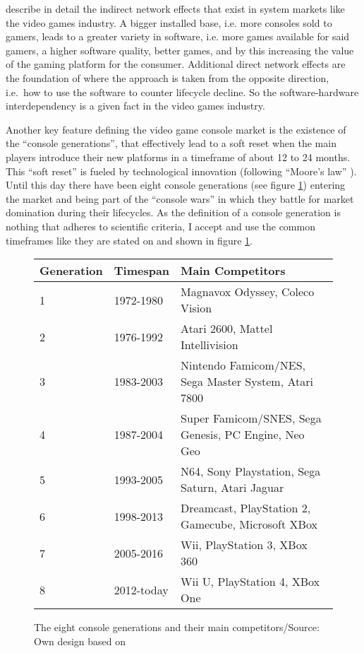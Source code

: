 \documentclass
[
    a4paper,
    11pt
]
{article}
\begin{document}
\cite{KatzMichaelL.1994} describe in detail the indirect network effects
that exist in system markets like the video games industry. A bigger
installed base, i.e. more consoles sold to gamers, leads to a greater
variety in software, i.e. more games available for said gamers, a higher
software quality, better games, and by this increasing the value of the
gaming platform for the consumer. Additional direct network effects are
the foundation of \cite{Marchand2016} where the approach is taken from
the opposite direction, i.e.~how to use the software to counter
lifecycle decline. So the software-hardware interdependency is a given fact
in the video games industry.\cite{Clements2005}

Another key feature defining the video game console market is the
existence of the ``console generations'', that effectively lead to a
soft reset when the main players introduce their new platforms in a
timeframe of about 12 to 24 months. This ``soft reset'' is fueled by
technological innovation \cite{Orland2013}(following ``Moore's law''
\cite{Moore1965}). Until this day there have been eight console
generations (see figure \ref{tab:generations}) entering the market and
being part of the ``console wars'' in which they battle for market
domination during their lifecycles. \cite{EncyclopediaGamia2016} As the
definition of a console generation is nothing that adheres to scientific
criteria, I accept and use the common timeframes like they are stated on
\cite{Wikipedia2016} and shown in figure \ref{tab:generations}.
%
\begin{figure}[h]
  \small
  \centering
    \begin{tabular}{  l  l  l }
    \hline
        Generation  &   Timespan    &   Main Competitors    \\ \hline \hline
        1&  1972-1980   &   Magnavox Odyssey, Coleco Vision \\
        2&  1976-1992   &   Atari 2600, Mattel Intellivision    \\
        3&  1983-2003   &   Nintendo Famicom/NES, Sega Master System, Atari 7800    \\
        4&  1987-2004   &   Super Famicom/SNES, Sega Genesis, PC Engine, Neo Geo    \\
        5&  1993-2005   &   N64, Sony Playstation, Sega Saturn, Atari Jaguar \\
        6&  1998-2013   &   Dreamcast, PlayStation 2, Gamecube, Microsoft XBox  \\
        7&  2005-2016  &   Wii, PlayStation 3, XBox 360    \\
        8&  2012-today  &   Wii U, PlayStation 4, XBox One  \\ \hline
    \end{tabular}
    \caption{The eight console generations and their main competitors/Source: Own design based on \cite{Wikipedia2016}}
    \label{tab:generations}
\end{figure}
\end{document}
